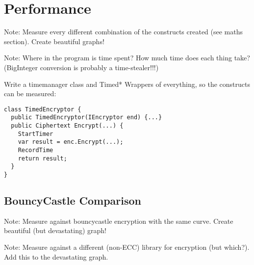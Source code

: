 \section{Performance}
\label{sec:performance}

Note: Measure every different combination of the constructs created (see maths section). Create beautiful graphs!

Note: Where in the program is time spent? How much time does each thing take? (BigInteger conversion is probably
a time-stealer!!!)

Write a timemanager class and Timed* Wrappers of everything, so the constructs can be measured:

\begin{verbatim}
class TimedEncryptor {
  public TimedEncryptor(IEncryptor end) {...}
  public Ciphertext Encrypt(...) {
    StartTimer
    var result = enc.Encrypt(...);
    RecordTime
    return result;
  }
}
\end{verbatim}

\subsection{BouncyCastle Comparison}
\label{sec:performance_bouncycastle}
Note: Measure against bouncycastle encryption with the same curve. Create beautiful (but devastating) graph!

Note: Measure against a different (non-ECC) library for encryption (but which?). Add this to the devastating graph.